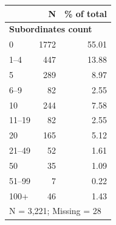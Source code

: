 \begin{tabular}{lrr}


\toprule


 & N & \% of total \\


\midrule


\multicolumn{3}{l}{\textbf{Subordinates count}}\\ 


\midrule
0           &        1772&       55.01\\
1–4         &         447&       13.88\\
5           &         289&        8.97\\
6–9         &          82&        2.55\\
10          &         244&        7.58\\
11–19       &          82&        2.55\\
20          &         165&        5.12\\
21–49       &          52&        1.61\\
50          &          35&        1.09\\
51–99       &           7&        0.22\\
100+        &          46&        1.43\\
\midrule


\multicolumn{3}{l}{\footnotesize N =        3,221; Missing =           28}\\


\bottomrule


\end{tabular}

